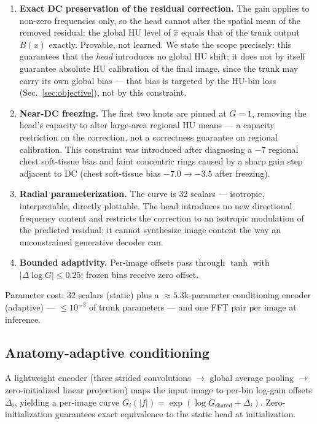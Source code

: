 \begin{enumerate}
  \item \textbf{Exact DC preservation of the residual correction.} The gain applies to non-zero frequencies only, so the head cannot alter the spatial mean of the removed residual: the global HU level of $\hat{x}$ equals that of the trunk output $B(x)$ exactly. Provable, not learned. We state the scope precisely: this guarantees that the \emph{head} introduces no global HU shift; it does not by itself guarantee absolute HU calibration of the final image, since the trunk may carry its own global bias --- that bias is targeted by the HU-bin loss (Sec.~\ref{sec:objective}), not by this constraint.
  \item \textbf{Near-DC freezing.} The first two knots are pinned at $G = 1$, removing the head's capacity to alter large-area regional HU means --- a capacity restriction on the correction, not a correctness guarantee on regional calibration. This constraint was introduced after diagnosing a $-7$\hu{} regional chest soft-tissue bias and faint concentric rings caused by a sharp gain step adjacent to DC (chest soft-tissue bias $-7.0 \rightarrow -3.5$\hu{} after freezing).
  \item \textbf{Radial parameterization.} The curve is 32 scalars --- isotropic, interpretable, directly plottable. The head introduces no new directional frequency content and restricts the correction to an isotropic modulation of the predicted residual; it cannot synthesize image content the way an unconstrained generative decoder can.
  \item \textbf{Bounded adaptivity.} Per-image offsets pass through $\tanh$ with $|\Delta \log G| \le 0.25$; frozen bins receive zero offset.
\end{enumerate}

Parameter cost: 32 scalars (static) plus a ${\approx}5.3$k-parameter conditioning encoder (adaptive) --- $\le 10^{-3}$ of trunk parameters --- and one FFT pair per image at inference.

\subsection{Anatomy-adaptive conditioning}
\label{sec:conditioning}

A lightweight encoder (three strided convolutions $\rightarrow$ global average pooling $\rightarrow$ zero-initialized linear projection) maps the input image to per-bin log-gain offsets $\Delta_i$, yielding a per-image curve $G_i(|f|) = \exp(\log G_{\mathrm{shared}} + \Delta_i)$. Zero-initialization guarantees exact equivalence to the static head at initialization.

